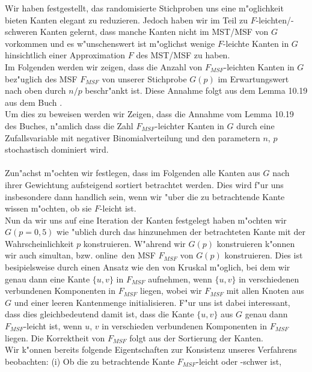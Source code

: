 Wir haben festgestellt, das randomisierte Stichproben uns eine m"oglichkeit 
    bieten Kanten elegant zu reduzieren.
    Jedoch haben wir im Teil zu $F$-leichten/-schweren Kanten gelernt, dass
    manche Kanten nicht im MST/MSF von $G$ vorkommen und es w"unschenswert
    ist m"oglichst wenige $F$-leichte Kanten in $G$ hinsichtlich einer 
    Approximation $F$ des MST/MSF zu haben.\\
Im Folgenden werden wir zeigen, dass die Anzahl von $F_{MSF}$-leichten Kanten in $G$ 
    bez"uglich des MSF $F_{MSF}$ von unserer Stichprobe $G(p)$ im Erwartungswert 
    nach oben durch $n/p$ beschr"ankt ist. 
    Diese Annahme folgt aus dem Lemma 10.19 aus dem Buch \cite{randAlg}.\\
Um dies zu beweisen werden wir Zeigen, dass die Annahme vom Lemma 10.19 des
    Buches, n"amlich dass die Zahl $F_{MSF}$-leichter Kanten in $G$ durch
    eine Zufallsvariable mit negativer Binomialverteilung und den parametern
    $n$, $p$ stochastisch dominiert wird.\\
\\
Zun"achst m"ochten wir festlegen, dass im Folgenden alle Kanten aus $G$ nach 
    ihrer Gewichtung aufsteigend sortiert betrachtet werden.
    Dies wird f"ur uns insbesondere dann handlich sein, wenn wir "uber die zu 
    betrachtende Kante wissen m"ochten, ob sie $F$-leicht ist.\\
Nun da wir uns auf eine Iteration der Kanten festgelegt haben m"ochten wir 
    $G(p=0,5)$ wie "ublich durch das hinzunehmen der betrachteten Kante mit
    der Wahrscheinlichkeit $p$ konstruieren.
    W"ahrend wir $G(p)$ konstruieren k"onnen wir auch simultan, bzw. 
    \glqq online\grqq\ den MSF $F_{MSF}$ von $G(p)$ konstruieren.
    Dies ist besipielsweise durch einen Ansatz wie den von Kruskal m"oglich, bei
    dem wir genau dann eine Kante $\{u,v\}$ in $F_{MSF}$ aufnehmen, wenn $\{u,v\}$
    in verschiedenen verbundenen Komponenten in $F_{MSF}$ liegen, wobei wir 
    $F_{MSF}$ mit allen Knoten aus $G$ und einer leeren Kantenmenge 
    initialisieren.
    F"ur uns ist dabei interessant, dass dies gleichbedeutend damit ist, dass die Kante 
    $\{u,v\}$
    aus $G$ genau dann $F_{MSF}$-leicht ist, wenn $u$, $v$ in verschieden 
    verbundenen Komponenten in $F_{MSF}$ liegen.
    Die Korrektheit von $F_{MSF}$ folgt aus der Sortierung der Kanten.\\
Wir k"onnen bereits folgende Eigentschaften zur Konsistenz unseres Verfahrens
    beobachten: 
    (i) Ob die zu betrachtende Kante $F_{MSF}$-leicht oder -schwer ist, 

